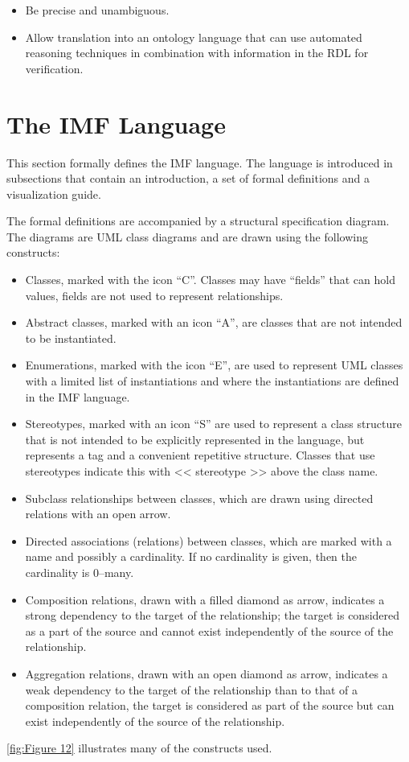 \begin{itemize}
        \begin{itemize}
          \item Be precise and unambiguous.
          \item Allow translation into an ontology language that can use automated reasoning techniques in combination with
                information in the RDL for verification.
        \end{itemize}
\end{itemize}
\section{The IMF Language}
This section formally defines the IMF language. The language is introduced in subsections
that contain an introduction, a set of formal definitions and a visualization guide.

The formal definitions are accompanied by a structural specification diagram. The diagrams are UML class diagrams and are drawn using the following constructs:

\begin{itemize}
  \item Classes, marked with the icon ``C''. Classes may have
        ``fields'' that can hold values, fields are not used to represent relationships.
  \item Abstract classes, marked with an icon ``A'', are classes that are not intended to be
        instantiated.
  \item Enumerations, marked with the icon ``E'', are used to represent UML classes with a
        limited list of instantiations and where the instantiations are defined in the IMF language.
  \item Stereotypes, marked with an icon ``S'' are used to represent a class structure that is
        not intended to be explicitly represented in the language, but represents a tag and a convenient repetitive
        structure. Classes that use stereotypes indicate this with {\textless}{\textless} stereotype
          {\textgreater}{\textgreater} above the class name.
  \item Subclass relationships between classes, which are drawn using directed relations with an open arrow.
  \item Directed associations (relations) between classes, which are marked with a name and possibly a cardinality. If
        no cardinality is given, then the cardinality is 0--many.
  \item Composition relations, drawn with a filled diamond as arrow, indicates a strong dependency to the target of the
        relationship; the target is considered as a part of the source and cannot exist independently of the source of the
        relationship.
  \item Aggregation relations, drawn with an open diamond as arrow, indicates a weak dependency to the target of the
        relationship than to that of a composition relation, the target is considered as part of the source but can exist
        independently of the source of the relationship.
\end{itemize}
\autoref{fig:Figure 12} illustrates many of the constructs used.

